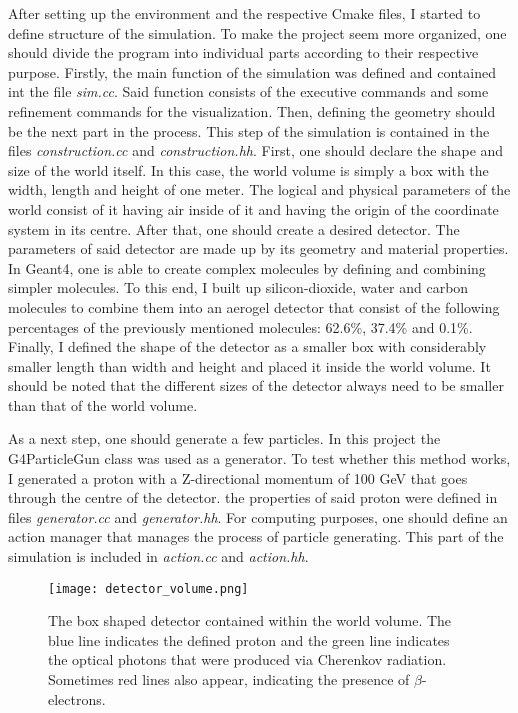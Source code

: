 \documentclass[12pt,twocolumn]{article}
\begin{document}
After setting up the environment and the respective Cmake files, I started to define structure of the simulation. To make the project seem more organized, one should divide the program into individual parts according to their respective purpose. Firstly, the main function of the simulation was defined and contained int the file \emph{sim.cc}. Said function consists of the executive commands and some refinement commands for the visualization. Then, defining the geometry should be the next part in the process. This step of the simulation is contained in the files \emph{construction.cc} and \emph{construction.hh}. First, one should declare the shape and size of the world itself. In this case, the world volume is simply a box with the width, length and height of one meter. The logical and physical parameters of the world consist of it having air inside of it and having the origin of the coordinate system in its centre. After that, one should create a desired detector. The parameters of said detector are made up by its geometry and material properties. In Geant4, one is able to create complex molecules by defining and combining simpler molecules. To this end, I built up silicon-dioxide, water and carbon molecules to combine them into an aerogel detector that consist of the following percentages of the previously mentioned molecules: 62.6\%, 37.4\% and 0.1\%. Finally, I defined the shape of the detector as a smaller box with considerably smaller length than width and height and placed it inside the world volume. It should be noted that the different sizes of the detector always need to be smaller than that of the world volume.

As a next step, one should generate a few particles. In this project the G4ParticleGun class was used as a generator. To test whether this method works, I generated a proton with a Z-directional momentum of 100 GeV that goes through the centre of the detector. the properties of said proton were defined in files \emph{generator.cc} and \emph{generator.hh}. For computing purposes, one should define an action manager that manages the process of particle generating. This part of the simulation is included in \emph{action.cc} and \emph{action.hh}.

\begin{figure}[H]
    \centering
    \texttt{[image: detector\_volume.png]}
    \caption{The box shaped detector contained within the world volume. The blue line indicates the defined proton and the green line indicates the optical photons that were produced via Cherenkov radiation. Sometimes red lines also appear, indicating the presence of $\beta$-electrons.}
    \label{fig:basic}
\end{figure}
\end{document}
